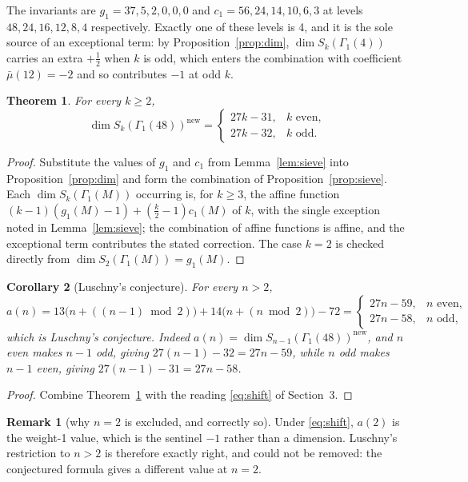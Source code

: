 \documentclass[11pt,a4paper]{article}
\theoremstyle{plain}
\newtheorem{theorem}{Theorem}
\newtheorem{corollary}[theorem]{Corollary}
\theoremstyle{definition}
\newtheorem*{remark}{Remark}
\begin{document}
The invariants are $g_{1}=37,5,2,0,0,0$ and $c_{1}=56,24,14,10,6,3$ at levels
$48,24,16,12,8,4$ respectively. Exactly one of these levels is 4, and it is the sole source
of an exceptional term: by Proposition~\ref{prop:dim}, $\dim S_{k}(\Gamma_{1}(4))$ carries
an extra $+\tfrac12$ when $k$ is odd, which enters the combination with coefficient
$\bar\mu(12)=-2$ and so contributes $-1$ at odd $k$.

\begin{theorem}\label{thm:main}
For every $k\ge2$,
\[
  \dim S_{k}(\Gamma_{1}(48))^{\mathrm{new}}=\begin{cases}27k-31,&k\text{ even},\\
  27k-32,&k\text{ odd}.\end{cases}
\]
\end{theorem}

\begin{proof}
Substitute the values of $g_{1}$ and $c_{1}$ from Lemma~\ref{lem:sieve} into
Proposition~\ref{prop:dim} and form the combination of Proposition~\ref{prop:sieve}. Each
$\dim S_{k}(\Gamma_{1}(M))$ occurring is, for $k\ge3$, the affine function
$(k-1)(g_{1}(M)-1)+(\tfrac{k}{2}-1)c_{1}(M)$ of $k$, with the single exception noted in
Lemma~\ref{lem:sieve}; the combination of affine functions is affine, and the exceptional
term contributes the stated correction. The case $k=2$ is checked directly from
$\dim S_{2}(\Gamma_{1}(M))=g_{1}(M)$.
\end{proof}

\begin{corollary}[Luschny's conjecture]\label{cor:main}
For every $n>2$,
\[
  a(n)=13\bigl(n+((n-1)\bmod2)\bigr)+14\bigl(n+(n\bmod2)\bigr)-72
  =\begin{cases}27n-59,&n\text{ even},\\ 27n-58,&n\text{ odd},\end{cases}
\]
which is Luschny's conjecture. Indeed $a(n)=\dim S_{n-1}(\Gamma_{1}(48))^{\mathrm{new}}$,
and $n$ even makes $n-1$ odd, giving $27(n-1)-32=27n-59$, while $n$ odd makes $n-1$ even,
giving $27(n-1)-31=27n-58$.
\end{corollary}

\begin{proof}
Combine Theorem~\ref{thm:main} with the reading \eqref{eq:shift} of Section~3.
\end{proof}

\begin{remark}[why $n=2$ is excluded, and correctly so]
Under \eqref{eq:shift}, $a(2)$ is the weight-1 value, which is the sentinel $-1$ rather
than a dimension. Luschny's restriction to $n>2$ is therefore exactly right, and could not
be removed: the conjectured formula gives a different value at $n=2$.
\end{remark}
\end{document}

